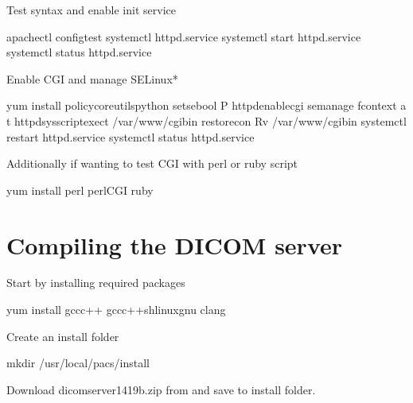 \documentclass[letterpaper,10pt,english]{sphinxmanual}
\begin{document}
Test syntax and enable init service

%
\begin{sphinxVerbatim}[commandchars=\\\{\}]
apachectl configtest
systemctl  httpd.service
systemctl start httpd.service
systemctl status httpd.service
\end{sphinxVerbatim}

Enable CGI and manage SELinux*

%
\begin{sphinxVerbatim}[commandchars=\\\{\}]
yum install policycoreutils\PYGZhy{}python
setsebool \PYGZhy{}P httpd\PYGZus{}enable\PYGZus{}cgi 
semanage fcontext \PYGZhy{}a \PYGZhy{}t httpd\PYGZus{}sys\PYGZus{}script\PYGZus{}exec\PYGZus{}t /var/www/cgi\PYGZhy{}bin
restorecon \PYGZhy{}Rv /var/www/cgi\PYGZhy{}bin
systemctl restart httpd.service
systemctl status httpd.service
\end{sphinxVerbatim}

Additionally if wanting to test CGI with perl or ruby script

%
\begin{sphinxVerbatim}[commandchars=\\\{\}]
yum install perl perl\PYGZhy{}CGI ruby
\end{sphinxVerbatim}


\section{Compiling the DICOM server}
\label{\detokenize{trl2:compiling-the-dicom-server}}
Start by installing required packages

%
\begin{sphinxVerbatim}[commandchars=\\\{\}]
yum install gcc\PYGZhy{}c++ gcc\PYGZhy{}c++\PYGZhy{}sh\PYGZhy{}linux\PYGZhy{}gnu clang
\end{sphinxVerbatim}

Create an install folder

%
\begin{sphinxVerbatim}[commandchars=\\\{\}]
mkdir /usr/local/pacs/install
\end{sphinxVerbatim}

Download dicomserver1419b.zip from  and save to install folder.
\end{document}
